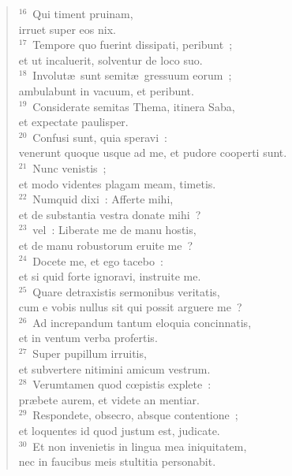 \begin{flushleft}
\begin{verse}
${}^{16}$~Qui timent pruinam,\\ irruet super eos nix.\\
${}^{17}$~Tempore quo fuerint dissipati, peribunt~;\\ et ut incaluerit, solventur de loco suo.\\
${}^{18}$~Involut\ae\ sunt semit\ae\ gressuum eorum~;\\ ambulabunt in vacuum, et peribunt.\\
${}^{19}$~Considerate semitas Thema, itinera Saba,\\ et expectate paulisper.\\
${}^{20}$~Confusi sunt, quia speravi~:\\ venerunt quoque usque ad me, et pudore cooperti sunt.\\
${}^{21}$~Nunc venistis~;\\ et modo videntes plagam meam, timetis.\\
${}^{22}$~Numquid dixi~: Afferte mihi,\\ et de substantia vestra donate mihi~?\\
${}^{23}$~vel~: Liberate me de manu hostis,\\ et de manu robustorum eruite me~?\\
${}^{24}$~Docete me, et ego tacebo~:\\ et si quid forte ignoravi, instruite me.\\
${}^{25}$~Quare detraxistis sermonibus veritatis,\\ cum e vobis nullus sit qui possit arguere me~?\\
${}^{26}$~Ad increpandum tantum eloquia concinnatis,\\ et in ventum verba profertis.\\
${}^{27}$~Super pupillum irruitis,\\ et subvertere nitimini amicum vestrum.\\
${}^{28}$~Verumtamen quod cœpistis explete~:\\ pr\ae bete aurem, et videte an mentiar.\\
${}^{29}$~Respondete, obsecro, absque contentione~;\\ et loquentes id quod justum est, judicate.\\
${}^{30}$~Et non invenietis in lingua mea iniquitatem,\\ nec in faucibus meis stultitia personabit.\end{verse}\end{flushleft}


